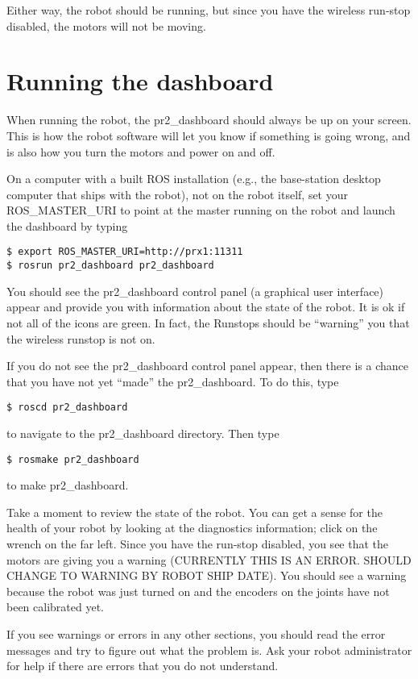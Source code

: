 Either way, the robot should be running, but since you have the wireless run-stop disabled, the motors will not be moving.  

\section{Running the dashboard}
When running the robot, the pr2\_dashboard should always be up on your screen.  This is how the robot software will 
let you know if something is going wrong, and is also how you turn the motors and power on and off.  

On a computer with a built ROS installation (e.g., the base-station desktop computer that ships with the robot), not on the robot itself, set your ROS\_MASTER\_URI to point at the master running on the robot and launch the dashboard by typing
\begin{verbatim}
$ export ROS_MASTER_URI=http://prx1:11311
$ rosrun pr2_dashboard pr2_dashboard
\end{verbatim}
You should see the pr2\_dashboard control panel (a graphical user interface) appear and provide you with information about the state of the robot. It is ok if not all of the icons are green. In fact, the Runstops should be ``warning'' you that the wireless runstop is not on. 

If you do not see the pr2\_dashboard control panel appear, then there is a chance that you have not yet ``made'' the pr2\_dashboard. To do this, type
\begin{verbatim}
$ roscd pr2_dashboard
\end{verbatim}
to navigate to the pr2\_dashboard directory. Then type
\begin{verbatim}
$ rosmake pr2_dashboard
\end{verbatim}
to make pr2\_dashboard.

Take a moment to review the state of the robot. You can get a sense for the health of 
your robot by looking at the diagnostics information; click on the wrench on the far left.  Since you have the run-stop disabled, you see that the motors are giving you a warning (CURRENTLY THIS IS AN ERROR.  SHOULD CHANGE TO WARNING BY 
ROBOT SHIP DATE).  You should see a warning because the robot was just turned on and the encoders on the joints have not 
been calibrated yet.

If you see warnings or errors in any other sections, you should read the error messages and try to figure out what the 
problem is.  Ask your robot administrator for help if there are errors that you do not understand.
